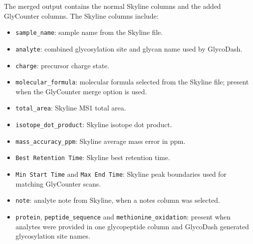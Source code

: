 \begin{optionalbox}
	\vspace{.5em}
	The merged output contains the normal Skyline columns and the added GlyCounter columns.
	The Skyline columns include:
	\begin{itemize}[topsep=0pt, itemsep=0pt]
		\item \texttt{sample\_name}: sample name from the Skyline file.
		\item \texttt{analyte}: combined glycosylation site and glycan name used by GlycoDash.
		\item \texttt{charge}: precursor charge state.
		\item \texttt{molecular\_formula}: molecular formula selected from the Skyline file; present when the GlyCounter merge option is used.
		\item \texttt{total\_area}: Skyline MS1 total area.
		\item \texttt{isotope\_dot\_product}: Skyline isotope dot product.
		\item \texttt{mass\_accuracy\_ppm}: Skyline average mass error in ppm.
		\item \texttt{Best Retention Time}: Skyline best retention time.
		\item \texttt{Min Start Time} and \texttt{Max End Time}: Skyline peak boundaries used for matching GlyCounter scans.
		\item \texttt{note}: analyte note from Skyline, when a notes column was selected.
		\item \texttt{protein}, \texttt{peptide\_sequence} and \texttt{methionine\_oxidation}: present when analytes were provided in one glycopeptide column and GlycoDash generated glycosylation site names.
	\end{itemize}
	

\end{optionalbox}
